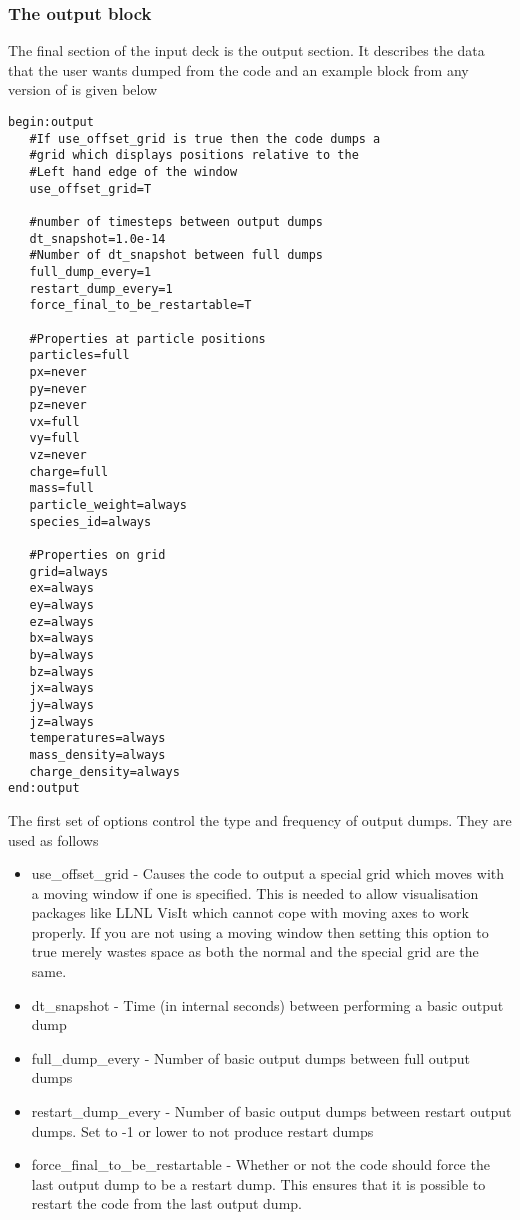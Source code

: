 \documentclass[12pt,a4paper]{article}
\newcommand{\simpleboxverbatim}{\begin{Verbatim}[obeytabs=true,frame=single,
  framerule=0.5mm,rulecolor=\color{warwickmid},formatcom=\color{black}]}
\newcommand{\EPOCH}{{\color{warwickdark}\fontfamily{phv}\selectfont{EPOCH}}}
\begin{document}
\subsubsection{The output block}
The final section of the input deck is the output section. It describes the
data that the user wants dumped from the code and an example block from any
version of {\EPOCH} is given below\\
\simpleboxverbatim
begin:output
   #If use_offset_grid is true then the code dumps a
   #grid which displays positions relative to the
   #Left hand edge of the window
   use_offset_grid=T

   #number of timesteps between output dumps
   dt_snapshot=1.0e-14
   #Number of dt_snapshot between full dumps
   full_dump_every=1
   restart_dump_every=1
   force_final_to_be_restartable=T

   #Properties at particle positions
   particles=full
   px=never
   py=never
   pz=never
   vx=full
   vy=full
   vz=never
   charge=full
   mass=full
   particle_weight=always
   species_id=always

   #Properties on grid
   grid=always
   ex=always
   ey=always
   ez=always
   bx=always
   by=always
   bz=always
   jx=always
   jy=always
   jz=always
   temperatures=always
   mass_density=always
   charge_density=always
end:output
\end{Verbatim}

The first set of options control the type and frequency of output dumps. They
are used as follows\\
\begin{itemize}
\item use\_offset\_grid - Causes the code to output a special grid which moves
  with a moving window if one is specified. This is needed to allow
  visualisation packages like LLNL VisIt which cannot cope with moving axes to
  work properly. If you are not using a moving window then setting this option
  to true merely wastes space as both the normal and the special grid are the
  same.
\item dt\_snapshot - Time (in internal seconds) between performing a basic
  output dump
\item full\_dump\_every - Number of basic output dumps between full output
  dumps
\item restart\_dump\_every - Number of basic output dumps between restart
  output dumps. Set to -1 or lower to not produce restart dumps
\item force\_final\_to\_be\_restartable - Whether or not the code should force
  the last output dump to be a restart dump. This ensures that it is possible
  to restart the code from the last output dump.
\end{itemize}
\end{document}
